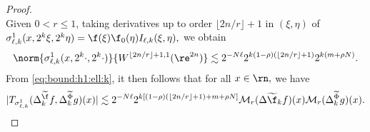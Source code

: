 \begin{proof}
\begin{equation*}
\end{equation*}
Given $0< r \le 1$, taking  derivatives up to order $\lfloor{2n/r}\rfloor + 1$ in $(\xi,\eta)$ of
$\sigma^1_{\ell, k}(x, 2^k \xi, 2^k \eta) = \f(\xi) \f_0(\eta)  I_{\ell, k}(\xi, \eta),$
 we obtain
\begin{align}\label{eq:estsigkl}
  \norm{\sigma^1_{\ell, k}(x, 2^{k} \cdot, 2^{k} \cdot)}{W^{\lfloor{2n/r}\rfloor + 1,1}(\re^{2n})} \lesssim 2^{- N \ell} 2^{k (1-\rho)( \lfloor{2n/r}\rfloor + 1)} 2^{k (m+\rho N)}.
\end{align}
From \eqref{eq:bound:h1:ell:k}, it then follows that for all $x\in\rn,$ we have
\begin{equation*}
|T_{\sigma^1_{\ell,k}}(\Delta^{\widetilde{\f}}_k f,\Delta^{\widetilde{\Phi}}_k g)(x)|  \lesssim 2^{- N \ell} 2^{k [(1-\rho)( \lfloor{2n/r}\rfloor + 1)+m+\rho N]}    \mathcal{M}_r(\Delta{\widetilde{\f}}_k f)(x)\mathcal{M}_r(\Delta^{\widetilde{\Phi}}_k g)(x).
\end{equation*}


\end{proof}
